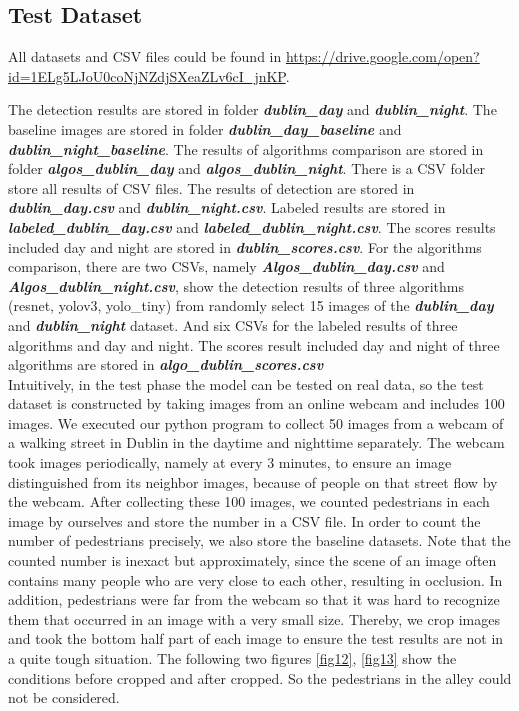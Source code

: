 \documentclass[runningheads]{llncs}
\begin{document}
\subsection{Test Dataset}
All datasets and CSV files could be found in \url{https://drive.google.com/open?id=1ELg5LJoU0coNjNZdjSXeaZLv6cI_jnKP}.

The detection results are stored in folder \textit{\textbf{dublin\_day}} 
and \textit{\textbf{dublin\_night}}. The baseline images are stored in folder \textit{\textbf{dublin\_day\_baseline}} and \textit{\textbf{dublin\_night\_baseline}}. The results of algorithms comparison are stored in folder \textit{\textbf{algos\_dublin\_day}} and \textit{\textbf{algos\_dublin\_night}}. There is a CSV folder store all results of CSV files. The results of detection are stored in \textit{\textbf{dublin\_day.csv}} and \textit{\textbf{dublin\_night.csv}}. Labeled results are stored in \textit{\textbf{labeled\_dublin\_day.csv}} and \textit{\textbf{labeled\_dublin\_night.csv}}. The scores results included day and night are stored in \textit{\textbf{dublin\_scores.csv}}. For the algorithms comparison, there are two CSVs, namely \textit{\textbf{Algos\_dublin\_day.csv}} and \textit{\textbf{Algos\_dublin\_night.csv}}, show the detection results of three algorithms (resnet, yolov3, yolo\_tiny) from randomly select 15 images of the \textit{\textbf{dublin\_day}} and \textit{\textbf{dublin\_night}} dataset. And six CSVs for the labeled results of three algorithms and day and night. The scores result included day and night of three algorithms are stored in \textit{\textbf{algo\_dublin\_scores.csv}}
\\

Intuitively, in the test phase the model can be tested on real data, so the test dataset is constructed by taking images from an online webcam and includes 100 images. We executed our python program to collect 50 images from a webcam of a walking street in Dublin in the daytime and nighttime separately. The webcam took images periodically, namely at every 3 minutes, to ensure an image distinguished from its neighbor images, because of people on that street flow by the webcam. After collecting these 100 images, we counted pedestrians in each image by ourselves and store the number in a CSV file. In order to count the number of pedestrians precisely, we also store the baseline datasets. Note that the counted number is inexact but approximately, since the scene of an image often contains many people who are very close to each other, resulting in occlusion. In addition, pedestrians were far from the webcam so that it was hard to recognize them that occurred in an image with a very small size. Thereby, we crop images and took the bottom half part of each image to ensure the test results are not in a quite tough situation. The following two figures \ref{fig12}, \ref{fig13} show the conditions before cropped and after cropped. So the pedestrians in the alley could not be considered. 
\end{document}
